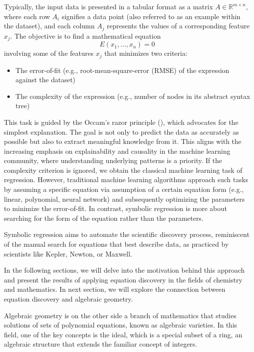 \documentclass[runningheads]{llncs}
\begin{document}
Typically, the input data is presented in a tabular format as a matrix
$A \in \mathbb{R}^{m \times n}$, where each row $A_i$ signifies a data 
point (also referred to as an example within the dataset), 
and each column $A_j$ represents the values of a corresponding feature $x_j$.
The objective is to find a mathematical equation
    $$E(x_1, ..., x_n) = 0$$ 
involving some of the features $x_j$ that minimizes two criteria:
\begin{itemize}
    \item The error-of-fit (e.g., root-mean-square-error (RMSE) of the expression against the dataset)
    \item The complexity of the expression (e.g., number of nodes in its abstract syntax tree)
\end{itemize}
This task is guided by the Occam’s razor principle (\cite{mdl}), 
which advocates for the simplest explanation. The goal is not only to predict the data as accurately as possible but also to extract meaningful knowledge from it. This aligns with the increasing emphasis on explainability and causality in the machine learning community, where understanding underlying patterns is a priority.
If the complexity criterion is ignored, 
we obtain the classical machine learning task of regression. 
However, traditional machine learning algorithms approach such tasks
by assuming a specific equation
via assumption of a certain equation form (e.g., linear, polynomial, neural network) 
and subsequently optimizing the parameters to minimize the error-of-fit. 
In contrast, symbolic regression is more about searching for the form of the equation
rather than the parameters.

Symbolic regression aims to automate the scientific discovery process, reminiscent of the manual search for equations that best describe data, as practiced by scientists like Kepler, Newton, or Maxwell.

In the following sections, we will delve into the motivation behind this approach and
present the results of applying equation discovery in the fields of 
chemistry and mathematics. 
In next section, we will explore the connection between equation discovery and 
algebraic geometry.




Algebraic geometry is on the other side
a branch of mathematics that studies solutions of sets of polynomial equations, known as algebraic varieties. In this field, one of the key concepts is the ideal, which is a special subset of a ring, an algebraic structure that extends the familiar concept of integers.
\end{document}
